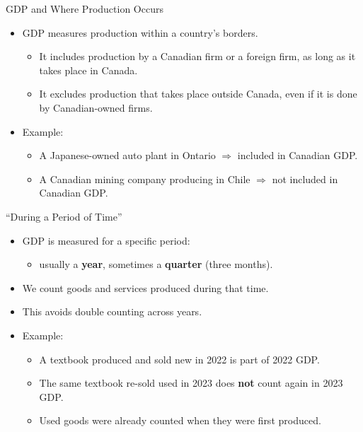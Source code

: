 \documentclass[aspectratio=169]{beamer}
\begin{document}
\begin{frame}{GDP and Where Production Occurs}
\transfade
\begin{itemize}
  \item GDP measures production within a \alert{country's borders}.
  \begin{itemize}
    \item It includes production by a Canadian firm or a foreign firm, as long as it takes place in Canada.
    \item It excludes production that takes place outside Canada, even if it is done by Canadian-owned firms.
  \end{itemize}
  \item Example:
  \begin{itemize}
    \item A Japanese-owned auto plant in Ontario \(\Rightarrow\) included in Canadian GDP.
    \item A Canadian mining company producing in Chile \(\Rightarrow\) not included in Canadian GDP.
  \end{itemize}
\end{itemize}
\end{frame}

\begin{frame}{``During a Period of Time''}
\transfade
\begin{itemize}
  \item GDP is measured for a specific period:
  \begin{itemize}
    \item usually a \textbf{year}, sometimes a \textbf{quarter} (three months).
  \end{itemize}
  \item We count goods and services \alert{produced during} that time.
  \item This avoids double counting across years.
  \item Example:
  \begin{itemize}
    \item A textbook produced and sold new in 2022 is part of 2022 GDP.
    \item The same textbook re-sold used in 2023 does \textbf{not} count again in 2023 GDP.
    \item Used goods were already counted when they were first produced.
  \end{itemize}
\end{itemize}
\end{frame}
\end{document}
